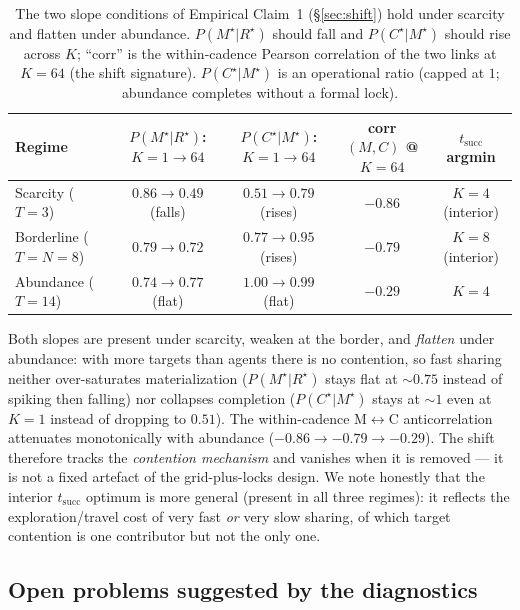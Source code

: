 \documentclass{article}
\begin{document}
\begin{table}[h]
\caption{The two slope conditions of Empirical Claim~1 (\S\ref{sec:shift}) hold under scarcity and flatten under abundance. $P(M^\star|R^\star)$ should fall and $P(C^\star|M^\star)$ should rise across $K$; ``corr'' is the within-cadence Pearson correlation of the two links at $K{=}64$ (the shift signature). $P(C^\star|M^\star)$ is an operational ratio (capped at $1$; abundance completes without a formal lock).}
\label{tab:cadence-robustness}
\centering
\small
\begin{tabular}{l c c c c}
\toprule
Regime & $P(M^\star|R^\star)$: $K{=}1\!\to\!64$ & $P(C^\star|M^\star)$: $K{=}1\!\to\!64$ & corr$(M,C)$ @ $K{=}64$ & $t_{\mathrm{succ}}$ argmin \\
\midrule
Scarcity ($T{=}3$)      & $0.86 \to 0.49$ (falls) & $0.51 \to 0.79$ (rises) & $-0.86$ & $K{=}4$ (interior) \\
Borderline ($T{=}N{=}8$) & $0.79 \to 0.72$        & $0.77 \to 0.95$ (rises) & $-0.79$ & $K{=}8$ (interior) \\
Abundance ($T{=}14$)    & $0.74 \to 0.77$ (flat)  & $1.00 \to 0.99$ (flat)  & $-0.29$ & $K{=}4$ \\
\bottomrule
\end{tabular}
\end{table}

Both slopes are present under scarcity, weaken at the border, and \emph{flatten}
under abundance: with more targets than agents there is no contention, so fast
sharing neither over-saturates materialization ($P(M^\star|R^\star)$ stays flat
at $\sim0.75$ instead of spiking then falling) nor collapses completion
($P(C^\star|M^\star)$ stays at $\sim1$ even at $K{=}1$ instead of dropping to
$0.51$). The within-cadence M$\leftrightarrow$C anticorrelation attenuates
monotonically with abundance ($-0.86\to-0.79\to-0.29$). The shift therefore
tracks the \emph{contention mechanism} and vanishes when it is removed --- it is
not a fixed artefact of the grid-plus-locks design. We note honestly that the
interior $t_{\mathrm{succ}}$ optimum is more general (present in all three
regimes): it reflects the exploration/travel cost of very fast \emph{or} very
slow sharing, of which target contention is one contributor but not the only
one.

\subsection{Open problems suggested by the diagnostics}
\label{app:open-problems}
\end{document}
